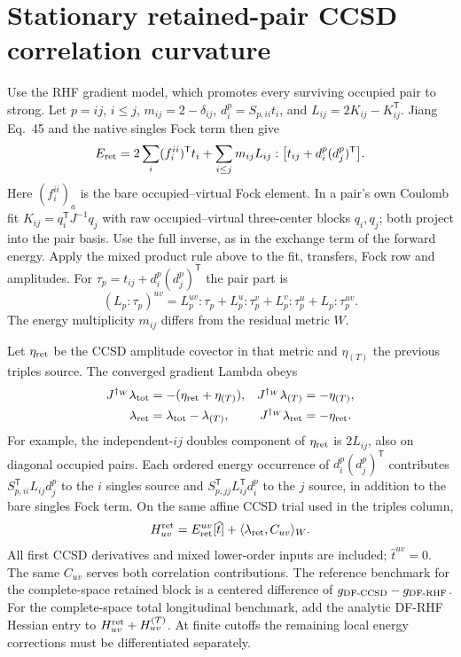 \documentclass[11pt]{article}
\begin{document}
\section{Stationary retained-pair CCSD correlation curvature}
Use the RHF gradient model, which promotes every surviving occupied pair
to strong. Let $p=ij$, $i\le j$, $m_{ij}=2-\delta_{ij}$,
$d_i^p=S_{p,ii}t_i$, and $L_{ij}=2K_{ij}-K_{ij}^{\mathsf T}$.
Jiang Eq.~45 and the native singles Fock term then give
\begin{equation}
 E_{\rm ret}=2\sum_i (f_i^{ii})^{\mathsf T} t_i
     +\sum_{i\le j}m_{ij}L_{ij}:
          \big[t_{ij}+d_i^p(d_j^p)^{\mathsf T}\big].
\end{equation}
Here $(f_i^{ii})_a$ is the bare occupied--virtual Fock element. In a pair's own
Coulomb fit $K_{ij}=q_i^{\mathsf T}J^{-1}q_j$ with raw occupied--virtual
three-center blocks $q_i,q_j$; both project into the pair basis. Use the
full inverse, as in the exchange term of the forward energy. Apply the
mixed product rule above to the fit, transfers, Fock row and amplitudes.
For $\tau_p=t_{ij}+d_i^p(d_j^p)^{\mathsf T}$ the pair part is
\begin{equation}
 (L_p:\tau_p)^{uv}=L_p^{uv}:\tau_p+L_p^u:\tau_p^v
                   +L_p^v:\tau_p^u+L_p:\tau_p^{uv}.
\end{equation}
The energy multiplicity $m_{ij}$ differs from the residual metric $W$.

Let $\eta_{\rm ret}$ be the CCSD amplitude covector in that metric and
$\eta_{(T)}$ the previous triples source. The converged gradient Lambda obeys
\begin{align}
 J^{\dagger_W}\lambda_{\rm tot}&=-(\eta_{\rm ret}+\eta_{(T)}),&
 J^{\dagger_W}\lambda_{(T)}&=-\eta_{(T)},\\
 \lambda_{\rm ret}&=\lambda_{\rm tot}-\lambda_{(T)},&
 J^{\dagger_W}\lambda_{\rm ret}&=-\eta_{\rm ret}.
\end{align}
For example, the independent-$ij$ doubles component of $\eta_{\rm ret}$
is $2L_{ij}$, also on diagonal occupied pairs. Each ordered energy occurrence
of $d_i^p(d_j^p)^{\mathsf T}$ contributes
$S_{p,ii}^{\mathsf T} L_{ij}d_j^p$ to the $i$ singles source and
$S_{p,jj}^{\mathsf T} L_{ij}^{\mathsf T}d_i^p$ to the $j$ source, in
addition to the bare singles Fock term.
On the same affine CCSD trial used in the triples column,
\begin{equation}
 H_{uv}^{\rm ret}=E_{\rm ret}^{uv}[\widehat t]
               +\langle\lambda_{\rm ret}, C_{uv}\rangle_W .
\end{equation}
All first CCSD derivatives and mixed lower-order inputs are included;
$\widehat t^{uv}=0$. The same $C_{uv}$ serves both correlation contributions.
The reference benchmark for the complete-space retained block is a centered
difference of $g_{\rm DF\text{-}CCSD}-g_{\rm DF\text{-}RHF}$. For the
complete-space total longitudinal benchmark, add the analytic DF-RHF Hessian
entry to $H_{uv}^{\rm ret}+H_{uv}^{(T)}$. At finite cutoffs the remaining
local energy corrections must be differentiated separately.
\end{document}
